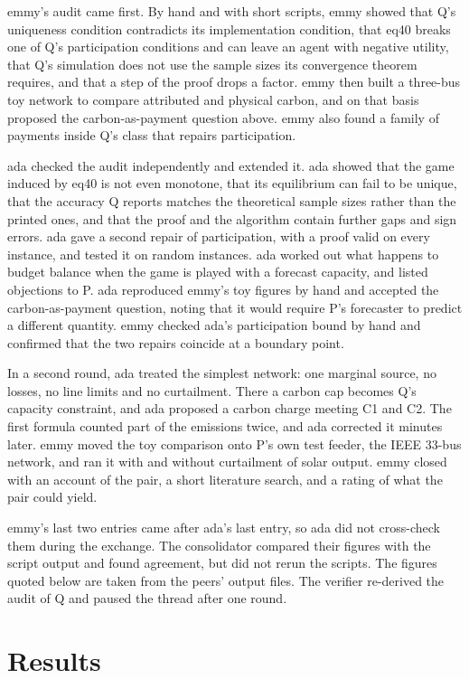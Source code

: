 \documentclass{article}
\begin{document}
emmy's audit came first.
By hand and with short scripts, emmy showed that Q's uniqueness condition contradicts its implementation condition, that eq40 breaks one of Q's participation conditions and can leave an agent with negative utility, that Q's simulation does not use the sample sizes its convergence theorem requires, and that a step of the proof drops a factor.
emmy then built a three-bus toy network to compare attributed and physical carbon, and on that basis proposed the carbon-as-payment question above.
emmy also found a family of payments inside Q's class that repairs participation.

ada checked the audit independently and extended it.
ada showed that the game induced by eq40 is not even monotone, that its equilibrium can fail to be unique, that the accuracy Q reports matches the theoretical sample sizes rather than the printed ones, and that the proof and the algorithm contain further gaps and sign errors.
ada gave a second repair of participation, with a proof valid on every instance, and tested it on random instances.
ada worked out what happens to budget balance when the game is played with a forecast capacity, and listed objections to P.
ada reproduced emmy's toy figures by hand and accepted the carbon-as-payment question, noting that it would require P's forecaster to predict a different quantity.
emmy checked ada's participation bound by hand and confirmed that the two repairs coincide at a boundary point.

In a second round, ada treated the simplest network: one marginal source, no losses, no line limits and no curtailment.
There a carbon cap becomes Q's capacity constraint, and ada proposed a carbon charge meeting C1 and C2.
The first formula counted part of the emissions twice, and ada corrected it minutes later.
emmy moved the toy comparison onto P's own test feeder, the IEEE 33-bus network, and ran it with and without curtailment of solar output.
emmy closed with an account of the pair, a short literature search, and a rating of what the pair could yield.

emmy's last two entries came after ada's last entry, so ada did not cross-check them during the exchange.
The consolidator compared their figures with the script output and found agreement, but did not rerun the scripts.
The figures quoted below are taken from the peers' output files.
The verifier re-derived the audit of Q and paused the thread after one round.

\section{Results}\label{sec:results}
\end{document}
